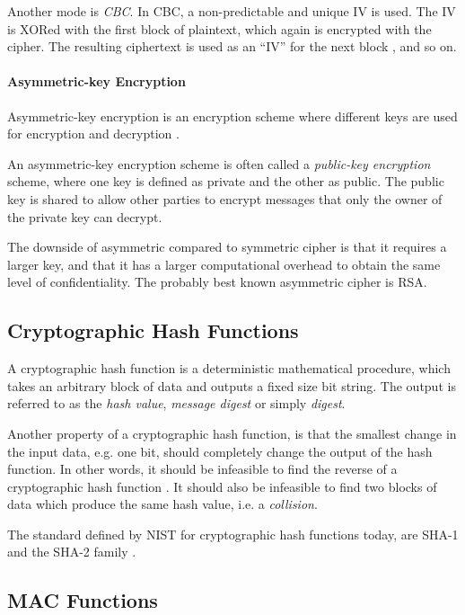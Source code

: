 \documentclass[pdftex,english,10pt,b5paper,twoside]{book}
\begin{document}
Another mode is \emph{\ac{CBC}}. In \ac{CBC}, a non-predictable and unique
\ac{IV} is used. The \ac{IV} is XORed with the first block of plaintext, which
again is encrypted with the cipher. The resulting ciphertext is used as an
``\ac{IV}'' for the next block \cite[p. 183]{stallings}, and so on.

\paragraph{Asymmetric-key Encryption} Asymmetric-key encryption is an encryption scheme
where different keys are used for encryption and decryption
\cite[p. 259]{stallings}.

An asymmetric-key encryption scheme is often called a \emph{public-key
encryption} scheme, where one key is defined as private and the other as public.
The public key is shared to allow other parties to encrypt messages that only the
owner of the private key can decrypt.

The downside of asymmetric compared to symmetric cipher is that it requires a
larger key, and that it has a larger computational overhead to obtain the same
level of confidentiality. The probably best known asymmetric cipher is
\ac{RSA}.

\subsection{Cryptographic Hash Functions}

A cryptographic hash function is a deterministic mathematical procedure, which
takes an arbitrary block of data and outputs a fixed size bit string. The
output is referred to as the \emph{hash value}, \emph{message digest} or simply
\emph{digest}.

Another property of a cryptographic hash function, is that the
smallest change in the input data, e.g. one bit, should completely change the
output of the hash function. In other words, it should be infeasible to find the
reverse of a cryptographic hash function \cite[p. 335]{stallings}. It should
also be infeasible to find two blocks of data which produce the same hash
value, i.e. a \emph{collision}.

The standard defined by \ac{NIST} for cryptographic hash functions today, are
\ac{SHA}-1 and the \ac{SHA}-2 family \cite{SHA-FIPS}. %


\subsection{MAC Functions}
\end{document}
